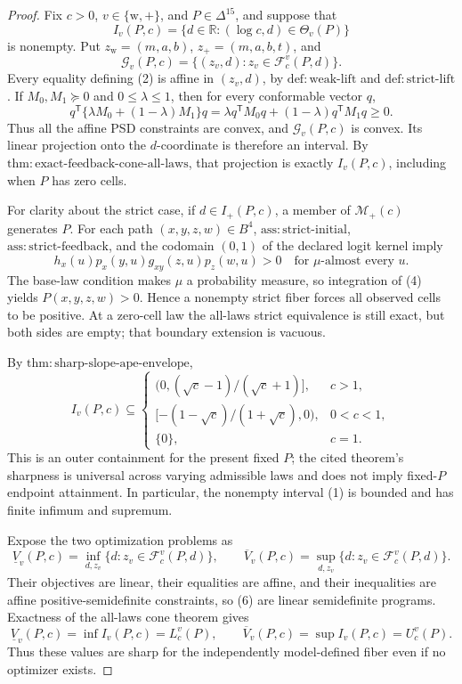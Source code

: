 \documentclass{article}
\begin{document}
\begin{proof}
Fix \(c>0\), \(v\in\{\mathrm w,+\}\), and \(P\in\Delta^{15}\), and suppose that
\[
 I_v(P,c)=\{d\in\mathbb R:(\log c,d)\in\Theta_v(P)\} \tag{1}
\]
is nonempty.  Put \(z_{\mathrm w}=(m,a,b)\), \(z_+=(m,a,b,t)\), and
\[
 \mathcal G_v(P,c)=\{(z_v,d):z_v\in\mathcal F_c^v(P,d)\}. \tag{2}
\]
Every equality defining (2) is affine in \((z_v,d)\), by \(\mathrm{def{:}weak\text{-}lift}\) and \(\mathrm{def{:}strict\text{-}lift}\).  If \(M_0,M_1\succeq0\) and \(0\le\lambda\le1\), then for every conformable vector \(q\),
\[
 q^{\mathsf T}\{\lambda M_0+(1-\lambda)M_1\}q
 =\lambda q^{\mathsf T}M_0q+(1-\lambda)q^{\mathsf T}M_1q\ge0. \tag{3}
\]
Thus all the affine PSD constraints are convex, and \(\mathcal G_v(P,c)\) is convex.  Its linear projection onto the \(d\)-coordinate is therefore an interval.  By \(\mathrm{thm{:}exact\text{-}feedback\text{-}cone\text{-}all\text{-}laws}\), that projection is exactly \(I_v(P,c)\), including when \(P\) has zero cells.

For clarity about the strict case, if \(d\in I_+(P,c)\), a member of \(\mathcal M_+(c)\) generates \(P\).  For each path \((x,y,z,w)\in B^4\), \(\mathrm{ass{:}strict\text{-}initial}\), \(\mathrm{ass{:}strict\text{-}feedback}\), and the codomain \((0,1)\) of the declared logit kernel imply
\[
 h_x(u)p_x(y,u)g_{xy}(z,u)p_z(w,u)>0
 \quad\text{for }\mu\text{-almost every }u. \tag{4}
\]
The base-law condition makes \(\mu\) a probability measure, so integration of (4) yields \(P(x,y,z,w)>0\).  Hence a nonempty strict fiber forces all observed cells to be positive.  At a zero-cell law the all-laws strict equivalence is still exact, but both sides are empty; that boundary extension is vacuous.

By \(\mathrm{thm{:}sharp\text{-}slope\text{-}ape\text{-}envelope}\),
\[
 I_v(P,c)\subseteq
 \begin{cases}
 (0,(\sqrt c-1)/(\sqrt c+1)],&c>1,\\
 [-(1-\sqrt c)/(1+\sqrt c),0),&0<c<1,\\
 \{0\},&c=1.
 \end{cases} \tag{5}
\]
This is an outer containment for the present fixed \(P\); the cited theorem's sharpness is universal across varying admissible laws and does not imply fixed-\(P\) endpoint attainment.  In particular, the nonempty interval (1) is bounded and has finite infimum and supremum.

Expose the two optimization problems as
\[
 \underline V_v(P,c)=\inf_{d,z_v}\{d:z_v\in\mathcal F_c^v(P,d)\},
 \qquad
 \overline V_v(P,c)=\sup_{d,z_v}\{d:z_v\in\mathcal F_c^v(P,d)\}. \tag{6}
\]
Their objectives are linear, their equalities are affine, and their inequalities are affine positive-semidefinite constraints, so (6) are linear semidefinite programs.  Exactness of the all-laws cone theorem gives
\[
 \underline V_v(P,c)=\inf I_v(P,c)=L_c^v(P),
 \qquad
 \overline V_v(P,c)=\sup I_v(P,c)=U_c^v(P). \tag{7}
\]
Thus these values are sharp for the independently model-defined fiber even if no optimizer exists.


\end{proof}
\end{document}
